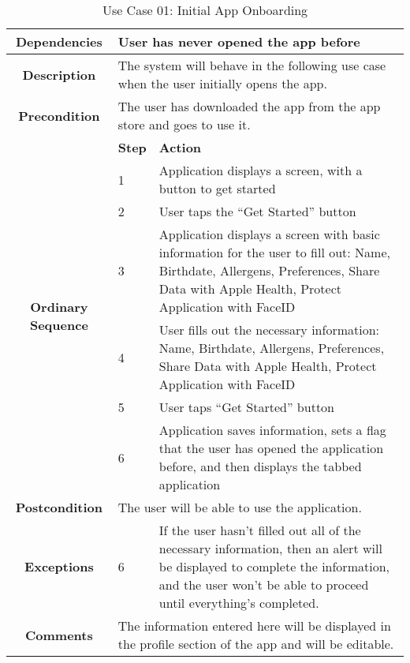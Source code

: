 \begin{table}[ht]
\centering
\caption{Use Case 01: Initial App Onboarding}

\hspace{1em}
\renewcommand{\arraystretch}{1.7}

\begin{tabular}{|c|p{2em}|p{14cm}|}
\hline
\textbf{Dependencies} & \multicolumn{2}{|p{14cm}|}{User has never opened the app before} \\ 
\hline
\textbf{Description} & \multicolumn{2}{|p{14cm}|}{The system will behave in the following use case when the user initially opens the app.} \\
\hline
\textbf{Precondition} & \multicolumn{2}{|p{14cm}|}{The user has downloaded the app from the app store and goes to use it.} \\
\hline
\multirow{7}{4em}{\textbf{Ordinary Sequence}} & \textbf{Step} & \textbf{Action} \\
& 1 & Application displays a screen, with a button to get started \\
& 2 & User taps the “Get Started” button \\
& 3 & Application displays a screen with basic information for the user to fill out: Name, Birthdate, Allergens, Preferences, Share Data with Apple Health, Protect Application with FaceID \\
& 4 & User fills out the necessary information: Name, Birthdate, Allergens, Preferences, Share Data with Apple Health, Protect Application with FaceID \\
& 5 & User taps “Get Started” button \\
& 6 & Application saves information, sets a flag that the user has opened the application before, and then displays the tabbed application \\
\hline
\textbf{Postcondition} & \multicolumn{2}{|p{14cm}|}{The user will be able to use the application.} \\
\hline
\textbf{Exceptions} & 6 & If the user hasn’t filled out all of the necessary information, then an alert will be displayed to complete the information, and the user won’t be able to proceed until everything’s completed. \\
\hline
\textbf{Comments} & \multicolumn{2}{|p{14cm}|}{The information entered here will be displayed in the profile section of the app and will be editable.} \\
\hline
\end{tabular}
\end{table}
